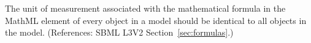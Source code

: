 The unit of measurement associated with the mathematical formula in the
MathML  element of every \KineticLaw object in a model should
be identical to all \KineticLaw objects in the model.  (References: SBML
L3V2 Section~\ref{sec:formulas}.)
